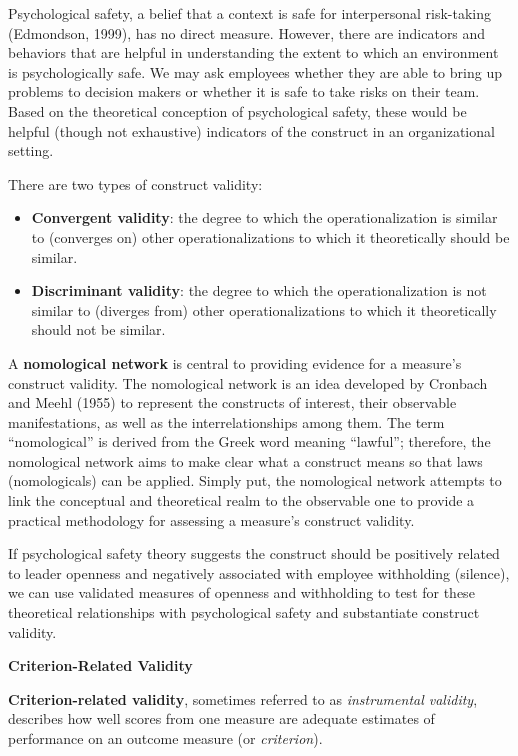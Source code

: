 \documentclass[
]{book}
\providecommand{\tightlist}{%
  \setlength{\itemsep}{0pt}\setlength{\parskip}{0pt}}
\begin{document}
Psychological safety, a belief that a context is safe for interpersonal risk-taking (Edmondson, 1999), has no direct measure. However, there are indicators and behaviors that are helpful in understanding the extent to which an environment is psychologically safe. We may ask employees whether they are able to bring up problems to decision makers or whether it is safe to take risks on their team. Based on the theoretical conception of psychological safety, these would be helpful (though not exhaustive) indicators of the construct in an organizational setting.

There are two types of construct validity:

\begin{itemize}
\tightlist
\item
  \textbf{Convergent validity}: the degree to which the operationalization is similar to (converges on) other operationalizations to which it theoretically should be similar.
\item
  \textbf{Discriminant validity}: the degree to which the operationalization is not similar to (diverges from) other operationalizations to which it theoretically should not be similar.
\end{itemize}

A \textbf{nomological network} is central to providing evidence for a measure's construct validity. The nomological network is an idea developed by Cronbach and Meehl (1955) to represent the constructs of interest, their observable manifestations, as well as the interrelationships among them. The term ``nomological'' is derived from the Greek word meaning ``lawful''; therefore, the nomological network aims to make clear what a construct means so that laws (nomologicals) can be applied. Simply put, the nomological network attempts to link the conceptual and theoretical realm to the observable one to provide a practical methodology for assessing a measure's construct validity.

If psychological safety theory suggests the construct should be positively related to leader openness and negatively associated with employee withholding (silence), we can use validated measures of openness and withholding to test for these theoretical relationships with psychological safety and substantiate construct validity.

\textbf{Criterion-Related Validity}

\textbf{Criterion-related validity}, sometimes referred to as \emph{instrumental validity}, describes how well scores from one measure are adequate estimates of performance on an outcome measure (or \emph{criterion}).
\end{document}
